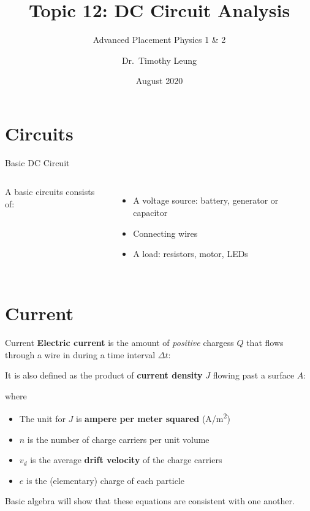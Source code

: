 \documentclass[12pt,aspectratio=169]{beamer}
\title{Topic 12: DC Circuit Analysis}
\subtitle{Advanced Placement Physics 1 \& 2}
\author[TML]{Dr.\ Timothy Leung}
\institute{Olympiads School, Toronto, ON, Canada}
\date{August 2020}
\newcommand{\eq}[2]{\vspace{#1}{\Large\begin{displaymath}#2\end{displaymath}}}
\begin{document}
\begin{frame}
  \maketitle
\end{frame}


\section{Circuits}

\begin{frame}{Basic DC Circuit}
  \begin{columns}
    
    A basic circuits consists of:
    \begin{itemize}
    \item A voltage source: battery, generator or capacitor
    \item Connecting wires
    \item A load: resistors, motor, LEDs
    \end{itemize}
  \end{columns}
\end{frame}






\section{Current}

\begin{frame}{Current}
  \textbf{Electric current} is the amount of \emph{positive} chargess $Q$ that
  flows through a wire in during a time interval $\Delta t$:

  \eq{-.25in}{
    \boxed{I=\frac{Q}{\Delta t}}
  }

  It is also defined as the product of \textbf{current density} $J$ flowing past
  a surface $A$:
  
  \eq{-.2in}{
    \boxed{I=JA=nvqA}
  }

  \vspace{-.2in}where
  \begin{itemize}
  \item The unit for $J$ is \textbf{ampere per meter squared} (\si{A/m^2})
  \item $n$ is the number of charge carriers per unit volume
  \item $v_d$ is the average \textbf{drift velocity} of the charge carriers
  \item $e$ is the (elementary) charge of each particle
  \end{itemize}
  Basic algebra will show that these equations are consistent with one another.
\end{frame}
\end{document}
